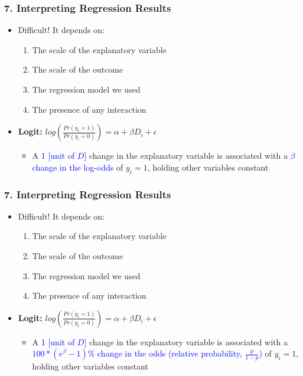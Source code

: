 \documentclass[xcolor=x11names,compress]{beamer}\usepackage[]{graphicx}\usepackage[]{color}
\renewcommand{\(}{\begin{columns}}
\renewcommand{\)}{\end{columns}}
\newcommand{\<}[1]{\begin{column}{#1}}
\renewcommand{\>}{\end{column}}
\begin{document}
\begin{frame}
\frametitle{7. Interpreting Regression Results}
\begin{itemize}
\item Difficult! It depends on:
\begin{enumerate}
\item The scale of the explanatory variable
\item The scale of the outcome
\item The regression model we used
\item The presence of any interaction
\end{enumerate}
\item \textbf{Logit:} $log(\frac{Pr(y_i=1)}{Pr(y_i=0)}) = \alpha + \beta D_i + \epsilon$
\begin{itemize}
\item A \textcolor{blue}{1 [unit of $D$]} change in the explanatory variable is associated with a \textcolor{blue}{$\beta$ change in the log-odds} of $y_i=1$, holding other variables constant
\end{itemize}
\end{itemize}
\end{frame}

\begin{frame}
\frametitle{7. Interpreting Regression Results}
\begin{itemize}
\item Difficult! It depends on:
\begin{enumerate}
\item The scale of the explanatory variable
\item The scale of the outcome
\item The regression model we used
\item The presence of any interaction
\end{enumerate}
\item \textbf{Logit:} $log(\frac{Pr(y_i=1)}{Pr(y_i=0)}) = \alpha + \beta D_i + \epsilon$
\begin{itemize}
\item A \textcolor{blue}{1 [unit of $D$]} change in the explanatory variable is associated with a \textcolor{blue}{$100*(e^{\beta}-1)\%$ change in the odds (relative probability, $\frac{p}{1-p}$)} of $y_i=1$, holding other variables constant
\end{itemize}
\end{itemize}
\end{frame}
\end{document}
